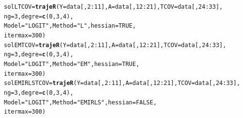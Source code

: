 \documentclass{article}\usepackage[]{graphicx}\usepackage[]{color}
\makeatletter
\newcommand{\hlnum}[1]{\textcolor[rgb]{0.686,0.059,0.569}{#1}}%
\newcommand{\hlstr}[1]{\textcolor[rgb]{0.192,0.494,0.8}{#1}}%
\newcommand{\hlopt}[1]{\textcolor[rgb]{0,0,0}{#1}}%
\newcommand{\hlstd}[1]{\textcolor[rgb]{0.345,0.345,0.345}{#1}}%
\newcommand{\hlkwb}[1]{\textcolor[rgb]{0.69,0.353,0.396}{#1}}%
\newcommand{\hlkwc}[1]{\textcolor[rgb]{0.333,0.667,0.333}{#1}}%
\newcommand{\hlkwd}[1]{\textcolor[rgb]{0.737,0.353,0.396}{\textbf{#1}}}%
\newenvironment{kframe}{%
 \def\at@end@of@kframe{}%
 \ifinner\ifhmode%
  \def\at@end@of@kframe{\end{minipage}}%
  \begin{minipage}{\columnwidth}%
 \fi\fi%
 \def\FrameCommand##1{\hskip\@totalleftmargin \hskip-\fboxsep
 \colorbox{shadecolor}{##1}\hskip-\fboxsep
     \hskip-\linewidth \hskip-\@totalleftmargin \hskip\columnwidth}%
 \MakeFramed {\advance\hsize-\width
   \@totalleftmargin\z@ \linewidth\hsize
   \@setminipage}}%
 {\par\unskip\endMakeFramed%
 \at@end@of@kframe}
\newenvironment{knitrout}{}{} %
\makeatother
\begin{document}
\begin{knitrout}
\color{fgcolor}\begin{kframe}
\begin{alltt}
\hlstd{solLTCOV} \hlkwb{=} \hlkwd{trajeR}\hlstd{(}\hlkwc{Y} \hlstd{= data[,}\hlnum{2}\hlopt{:}\hlnum{11}\hlstd{],} \hlkwc{A} \hlstd{=data[,}\hlnum{12}\hlopt{:}\hlnum{21}\hlstd{],} \hlkwc{TCOV} \hlstd{= data[,}\hlnum{24}\hlopt{:}\hlnum{33}\hlstd{],}
                  \hlkwc{ng} \hlstd{=} \hlnum{3}\hlstd{,} \hlkwc{degre} \hlstd{=} \hlkwd{c}\hlstd{(}\hlnum{0}\hlstd{,}\hlnum{3}\hlstd{,}\hlnum{4}\hlstd{),}
                  \hlkwc{Model} \hlstd{=} \hlstr{"LOGIT"}\hlstd{,} \hlkwc{Method} \hlstd{=} \hlstr{"L"}\hlstd{,} \hlkwc{hessian} \hlstd{=} \hlnum{TRUE}\hlstd{,}
                  \hlkwc{itermax} \hlstd{=} \hlnum{300}\hlstd{)}
\hlstd{solEMTCOV} \hlkwb{=} \hlkwd{trajeR}\hlstd{(}\hlkwc{Y} \hlstd{= data[,}\hlnum{2}\hlopt{:}\hlnum{11}\hlstd{],} \hlkwc{A} \hlstd{= data[,}\hlnum{12}\hlopt{:}\hlnum{21}\hlstd{],} \hlkwc{TCOV} \hlstd{= data[,}\hlnum{24}\hlopt{:}\hlnum{33}\hlstd{],}
                   \hlkwc{ng} \hlstd{=} \hlnum{3}\hlstd{,} \hlkwc{degre} \hlstd{=} \hlkwd{c}\hlstd{(}\hlnum{0}\hlstd{,}\hlnum{3}\hlstd{,}\hlnum{4}\hlstd{),}
                   \hlkwc{Model} \hlstd{=} \hlstr{"LOGIT"}\hlstd{,} \hlkwc{Method} \hlstd{=} \hlstr{"EM"}\hlstd{,} \hlkwc{hessian} \hlstd{=} \hlnum{TRUE}\hlstd{,}
                   \hlkwc{itermax} \hlstd{=} \hlnum{300}\hlstd{)}
\hlstd{solEMIRLSTCOV} \hlkwb{=} \hlkwd{trajeR}\hlstd{(}\hlkwc{Y} \hlstd{= data[,}\hlnum{2}\hlopt{:}\hlnum{11}\hlstd{],} \hlkwc{A} \hlstd{= data[,}\hlnum{12}\hlopt{:}\hlnum{21}\hlstd{],} \hlkwc{TCOV} \hlstd{= data[,}\hlnum{24}\hlopt{:}\hlnum{33}\hlstd{],}
                       \hlkwc{ng} \hlstd{=} \hlnum{3}\hlstd{,} \hlkwc{degre} \hlstd{=} \hlkwd{c}\hlstd{(}\hlnum{0}\hlstd{,}\hlnum{3}\hlstd{,}\hlnum{4}\hlstd{),}
                       \hlkwc{Model} \hlstd{=} \hlstr{"LOGIT"}\hlstd{,} \hlkwc{Method} \hlstd{=} \hlstr{"EMIRLS"}\hlstd{,} \hlkwc{hessian} \hlstd{=} \hlnum{FALSE}\hlstd{,}
                       \hlkwc{itermax} \hlstd{=} \hlnum{300}\hlstd{)}
\end{alltt}
\end{kframe}
\end{knitrout}
\end{document}
